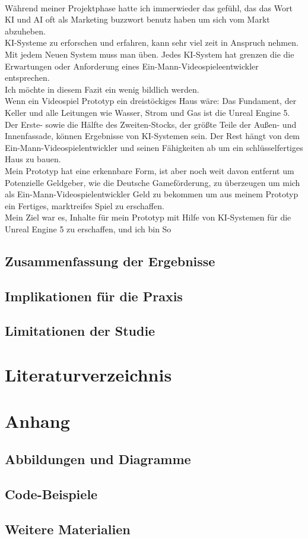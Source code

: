 \documentclass[10pt,a4paper,bibliography=totocnumbered,listof=totocnumbered]{scrartcl}
\begin{document}
\\
Während meiner Projektphase hatte ich immerwieder das gefühl, das das Wort KI und AI oft als Marketing buzzwort benutz haben um sich vom Markt abzuheben.
\\
KI-Systeme zu erforschen und erfahren, kann sehr viel zeit in Anspruch nehmen. Mit jedem Neuen System muss man üben. Jedes KI-System hat grenzen die die Erwartungen oder Anforderung eines Ein-Mann-Videospieleentwickler entsprechen.
\\
Ich möchte in diesem Fazit ein wenig bildlich werden.
\\
Wenn ein Videospiel Prototyp ein dreistöckiges Haus wäre:
Das Fundament, der Keller und alle Leitungen wie Wasser, Strom und Gas ist die Unreal Engine 5.
Der Erste- sowie die Hälfte des Zweiten-Stocks, der größte Teile der Außen- und Innenfassade, können Ergebnisse von KI-Systemen sein.
Der Rest hängt von dem Ein-Mann-Videospielentwickler und seinen Fähigkeiten ab um ein schlüsselfertiges Haus zu bauen.
\\
Mein Prototyp hat eine erkennbare Form, ist aber noch weit davon entfernt um Potenzielle Geldgeber, wie die Deutsche Gameförderung, zu überzeugen um mich als Ein-Mann-Videospielentwickler Geld zu bekommen um aus meinem Prototyp ein Fertiges, marktreifes Spiel zu erschaffen.
\\
Mein Ziel war es, Inhalte für mein Prototyp mit Hilfe von KI-Systemen für die Unreal Engine 5 zu erschaffen, und ich bin So
\subsection{Zusammenfassung der Ergebnisse}
\subsection{Implikationen für die Praxis}
\subsection{Limitationen der Studie}
\section{Literaturverzeichnis}
\printbibliography
\section{Anhang}
\subsection{Abbildungen und Diagramme}
\subsection{Code-Beispiele}
\printbibliography

\subsection{Weitere Materialien}

%
\end{document}
